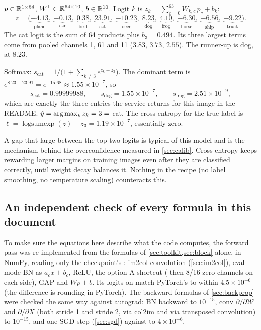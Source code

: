 \begin{repo}
$p\in\mathbb{R}^{1\times64}$, $W^{\!\top}\in\mathbb{R}^{64\times10}$, $b\in\mathbb{R}^{10}$. Logit $k$ is $z_k = \sum_{c=0}^{63} W_{k,c}\,p_c + b_k$:
\[
  z = \big(\underbrace{-4.13}_{\text{plane}},\;\underbrace{-0.13}_{\text{car}},\;\underbrace{0.38}_{\text{bird}},\;\underbrace{\mathbf{23.91}}_{\text{cat}},\;\underbrace{-10.23}_{\text{deer}},\;\underbrace{8.23}_{\text{dog}},\;\underbrace{4.10}_{\text{frog}},\;\underbrace{-6.30}_{\text{horse}},\;\underbrace{-6.56}_{\text{ship}},\;\underbrace{-9.22}_{\text{truck}}\big).
\]
The cat logit is the sum of 64 products plus $b_3=0.494$. Its three largest terms come from pooled channels 1, 61 and 11 ($3.83$, $3.73$, $2.55$). The runner-up is dog, at $8.23$.

Softmax: $s_\text{cat} = 1/\big(1+\sum_{k\neq3}e^{z_k-z_3}\big)$. The dominant term is $e^{8.23-23.91}=e^{-15.68}\approx1.55\times10^{-7}$, so
\[
  s_\text{cat}=0.99999988,\qquad s_\text{dog}=1.55\times10^{-7},\qquad s_\text{frog}=2.51\times10^{-9},
\]
which are exactly the three entries the service returns for this image in the README. $\hat y=\operatorname*{arg\,max}_k z_k=3=$ cat. The cross-entropy for the true label is $\ell=\operatorname{logsumexp}(z)-z_3=1.19\times10^{-7}$, essentially zero.
\end{repo}

\begin{warn}
A gap that large between the top two logits is typical of this model and is the mechanism behind the overconfidence measured in \cref{sec:calib}. Cross-entropy keeps rewarding larger margins on training images even after they are classified correctly, until weight decay balances it. Nothing in the recipe (no label smoothing, no temperature scaling) counteracts this.
\end{warn}

\subsection{An independent check of every formula in this document}

\begin{repo}
To make sure the equations here describe what the code computes, the forward pass was re-implemented from the formulas of \cref{sec:toolkit,sec:block} alone, in  NumPy, reading only the checkpoint's : im2col convolution (\cref{sec:im2col}), eval-mode BN as $a_cx+b_c$, ReLU, the option-A shortcut (\code{[:, ::2, ::2]} then 8/16 zero channels on each side), GAP and $Wp+b$. Its logits on  match PyTorch's to within $4.5\times10^{-6}$ (the difference is  rounding in PyTorch). The backward formulas of \cref{sec:backprop} were checked the same way against autograd: BN backward to $10^{-15}$, conv $\partial/\partial\mathcal W$ and $\partial/\partial X$ (both stride 1 and stride 2, via col2im and via transposed convolution) to $10^{-15}$, and one SGD step (\cref{sec:sgd}) against  to $4\times10^{-6}$.
\end{repo}
